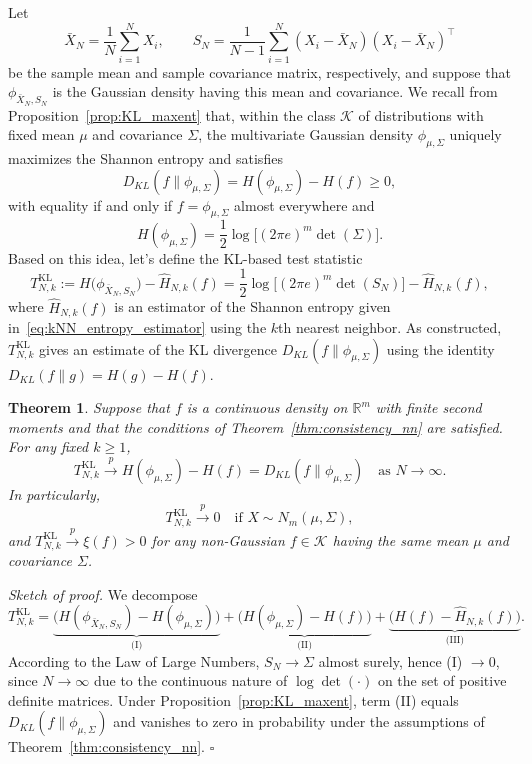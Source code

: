 \documentclass[12pt,a4paper]{article}
\newcommand{\R}{\mathbb R}
\theoremstyle{definition}
\theoremstyle{plain}
\newtheorem{theorem}{Theorem}[section]
\begin{document}
{Let
\[
\bar{ X}_N = \frac1N\sum_{i=1}^N X_i,
\qquad
{{S}}_N = \frac{1}{N-1}\sum_{i=1}^N (X_i-\bar{ X}_N)(X_i-\bar{ X}_N)^\top
\]
be the sample mean and sample covariance matrix, respectively, and suppose that $\phi_{\bar{ X}_N,{{S}}_N}$ is the Gaussian density having this mean and covariance.
We recall from Proposition~\ref{prop:KL_maxent} that, within the class
$\mathcal{K}$ of distributions with fixed mean ${\mu}$ and covariance ${{\Sigma}}$,
the multivariate Gaussian density $\phi_{{\mu},{{\Sigma}}}$ uniquely maximizes the
Shannon entropy and satisfies
\[
D_{KL}(f\|\phi_{{\mu},{{\Sigma}}}) = H(\phi_{{\mu},{{\Sigma}}}) - H(f) \ge 0,
\]
with equality if and only if $f=\phi_{{\mu},{{\Sigma}}}$ almost everywhere and
\[
H(\phi_{{\mu},{{\Sigma}}}) = \frac12 \log\bigl[(2\pi e)^m \det({{\Sigma}})\bigr].
\]
Based on this idea, let's define the KL-based test statistic
\begin{equation}
\label{eq:KL_test_stat}
T_{N,k}^{\mathrm{KL}}
  := H\!\bigl(\phi_{\bar{ X}_N,{{S}}_N}\bigr)
     - \widehat H_{N,k}(f)
  = \frac12 \log\bigl[(2\pi e)^m \det({{S}}_N)\bigr]
    - \widehat H_{N,k}(f),
\end{equation}
where $\widehat H_{N,k}(f)$ is an estimator of the Shannon entropy given in~\eqref{eq:kNN_entropy_estimator} using the $k$th nearest neighbor.
As constructed, $T_{N,k}^{\mathrm{KL}}$ gives an estimate of the KL divergence
$D_{KL}(f\|\phi_{{\mu},{{\Sigma}}})$ using the identity $D_{KL}(f\|g)=H(g)-H(f)$.

\begin{theorem}
\label{thm:KL_test_consistency}
Suppose that $f$ is a continuous density on $\R^m$ with finite second
moments and that the conditions of Theorem~\ref{thm:consistency_nn}
are satisfied. For any fixed $k\ge1$,
\[
T_{N,k}^{\mathrm{KL}}
\xrightarrow{p}
H(\phi_{{\mu},{{\Sigma}}}) - H(f)
= D_{KL}(f\|\phi_{{\mu},{{\Sigma}}})
\quad\text{as } N\to\infty.
\]
In particularly,
\[
T_{N,k}^{\mathrm{KL}} \xrightarrow{p} 0
\quad\text{if } X\sim N_m({\mu},{{\Sigma}}),
\]
and $T_{N,k}^{\mathrm{KL}} \xrightarrow{p} \xi(f)>0$ for any non-Gaussian
$f\in \mathcal{K}$ having the same mean ${\mu}$ and covariance ${{\Sigma}}$.
\end{theorem}

\noindent \emph{Sketch of proof.} We decompose
\[
T_{N,k}^{\mathrm{KL}}
= \underbrace{\bigl(H(\phi_{\bar{{X}}_N,{{S}}_N}) - H(\phi_{{\mu},{\Sigma}})\bigr)}_{\text{(I)}}
+ \underbrace{\bigl(H(\phi_{{\mu},{\Sigma}}) - H(f)\bigr)}_{\text{(II)}}
+ \underbrace{\bigl(H(f) - \widehat{H}_{N,k}(f)\bigr)}_{\text{(III)}}.
\]
According to the Law of Large Numbers, ${{S}}_N \to {\Sigma}$ almost surely, hence (I) $\to 0$,
since $N\to\infty$ due to the continuous nature of $\log\det(\cdot)$ on the set of positive definite matrices.
Under Proposition~\ref{prop:KL_maxent}, term (II) equals $D_{KL}(f\|\phi_{{\mu},{\Sigma}})$
and vanishes to zero in probability under the assumptions of Theorem~\ref{thm:consistency_nn}.
\hfill $\square$

}
\end{document}
